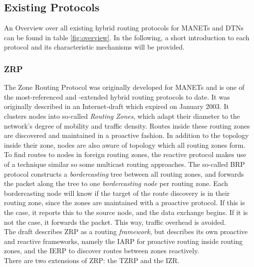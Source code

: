 \documentclass[a4paper,10pt]{scrartcl}
\begin{document}
\subsection{Existing Protocols}
\label{subsec:existing_protocols}
An Overview over all existing hybrid routing protocols for \glspl{MANET} and \glspl{DTN}
can be found in table \ref{fig:overview}. In the following, a short introduction to each protocol and its characteristic mechanisms will be provided.

\subsubsection{\gls{ZRP}}
\label{subsec:zrp}
The Zone Routing Protocol was originally developed for \glspl{MANET} and is one of the most-referenced and -extended hybrid routing protocols to date. It was originally described in an Internet-draft which expired on January 2003\cite{ZRP-Draft}.
It clusters nodes into so-called \emph{Routing Zones}, which adapt their diameter to the network's degree of mobility and traffic density. Routes inside these routing zones are discovered and maintained in a proactive fashion. In addition to the topology inside their zone, nodes are also aware of topology which all routing zones form.
To find routes to nodes in foreign routing zones, the reactive protocol makes use of a technique similar so some multicast routing approaches. The so-called \gls{BRP}\cite{draft-ietf-manet-zone-brp} protocol constructs a \emph{bordercasting} tree between all routing zones, and forwards the packet along the tree to one \emph{bordercasting node} per routing zone. Each bordercasting node will know if the target of the route discovery is in their routing zone, since the zones are maintained with a proactive protocol. If this is the case, it reports this to the source node, and the data exchange begins. If it is not the case, it forwards the packet. This way, traffic overhead is avoided.\\
The draft describes ZRP as a routing \emph{framework}, but describes its own proactive and reactive frameworks, namely the \gls{IARP}\cite{draft-ietf-manet-zone-iarp} for proactive routing inside routing zones, and the \gls{IERP}\cite{draft-ietf-manet-zone-ierp} to discover routes between zones reactively.\\
There are two extensions of ZRP: the \gls{TZRP}\cite{TZRP} and the \gls{IZR}\cite{IZR}. 
\end{document}

